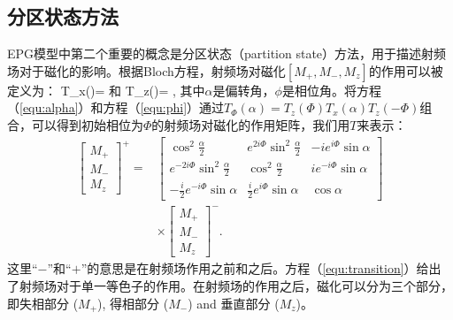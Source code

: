 \subsection{分区状态方法}
EPG模型中第二个重要的概念是分区状态（partition state）方法，用于描述射频场对于磁化的影响。根据Bloch方程，射频场对磁化$[M_+,M_-,M_z]$的作用可以被定义为：
 \beq 
  T_x(\alpha)=
   \label{equ:alpha}
 \eeq 
和
 \beq 
  T_z(\phi)=
  ,
   \label{equ:phi}
 \eeq
 其中$\alpha$是偏转角，$\phi$是相位角。将方程（\ref{equ:alpha}）和方程（\ref{equ:phi}）通过$T_\Phi(\alpha)=T_z(\Phi) T_x(\alpha)T_z(-\Phi)$组合，可以得到初始相位为$\Phi$的射频场对磁化的作用矩阵，我们用$T$来表示：
\begin{align} 
 \left[
  \begin{matrix}
   M_+ \\
   M_- \\
   M_z
   \end{matrix}
   \right]^+
   =&
   \left[
  \begin{matrix}
   \cos^2\frac{\alpha}{2} & e^{2i\Phi}\sin^2\frac{\alpha}{2} & -ie^{i\Phi}\sin\alpha \\
   e^{-2i\Phi}\sin^2\frac{\alpha}{2} & \cos^2\frac{\alpha}{2} & ie^{-i\Phi}\sin\alpha \\
   -\frac{i}{2}e^{-i\Phi}\sin\alpha & \frac{i}{2}e^{i\Phi}\sin\alpha & \cos\alpha
   \end{matrix}
   \right] \nonumber\\
   & \times
   \left[
  \begin{matrix}
   M_+ \\
   M_- \\
   M_z
   \end{matrix}
   \right]^-.
   \label{equ:transition}
 \end{align}
这里``$-$''和``$+$''的意思是在射频场作用之前和之后。方程（\ref{equ:transition}）给出了射频场对于单一等色子的作用。在射频场的作用之后，磁化可以分为三个部分，即失相部分 ($M_+$), 得相部分 ($M_-$) and 垂直部分 ($M_z$)。

